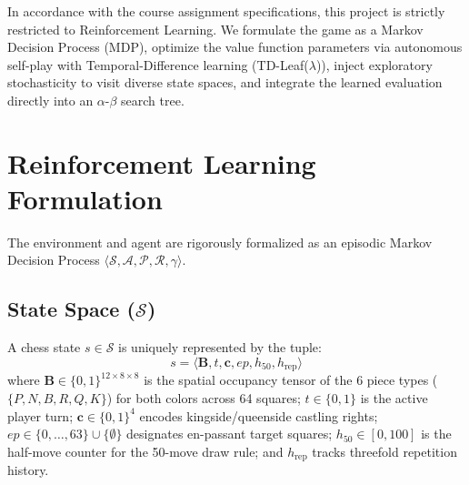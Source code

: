 \documentclass[conference,10pt,twocolumn]{IEEEtran}
\begin{document}
In accordance with the course assignment specifications, this project is strictly restricted to Reinforcement Learning. We formulate the game as a Markov Decision Process (MDP), optimize the value function parameters via autonomous self-play with Temporal-Difference learning (TD-Leaf($\lambda$)), inject exploratory stochasticity to visit diverse state spaces, and integrate the learned evaluation directly into an $\alpha$-$\beta$ search tree.

\section{Reinforcement Learning Formulation}
The environment and agent are rigorously formalized as an episodic Markov Decision Process $\langle \mathcal{S}, \mathcal{A}, \mathcal{P}, \mathcal{R}, \gamma \rangle$.

\subsection{State Space ($\mathcal{S}$)}
A chess state $s \in \mathcal{S}$ is uniquely represented by the tuple:
\begin{equation}
s = \langle \mathbf{B}, t, \mathbf{c}, ep, h_{50}, h_{\text{rep}} \rangle
\end{equation}
where $\mathbf{B} \in \{0, 1\}^{12 \times 8 \times 8}$ is the spatial occupancy tensor of the 6 piece types ($\{P, N, B, R, Q, K\}$) for both colors across 64 squares; $t \in \{0, 1\}$ is the active player turn; $\mathbf{c} \in \{0, 1\}^4$ encodes kingside/queenside castling rights; $ep \in \{0, \dots, 63\} \cup \{\emptyset\}$ designates en-passant target squares; $h_{50} \in [0, 100]$ is the half-move counter for the 50-move draw rule; and $h_{\text{rep}}$ tracks threefold repetition history.
\end{document}
